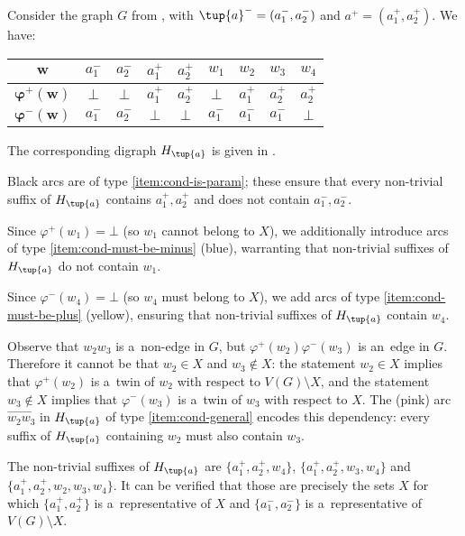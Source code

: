 \begin{example}
    Consider the graph $G$ from , with $\tup{a}^- = (a^-_1, a^-_2)$ and $a^+ = (a^+_1, a^+_2)$.
    We have:
    \begin{center}
        \begin{tabular}{|c||c|c|c|c|c|c|c|c|}
            \hline
            $\mathbf{w}$ & $a^-_1$ & $a^-_2$ & $a^+_1$ & $a^+_2$ & $w_1$ & $w_2$ & $w_3$ & $w_4$ \\ \hline \hline
            $\mathbf{\varphi^+(w)}$ & $\bot$ & $\bot$ & $a^+_1$ & $a^+_2$ & $\bot$ & $a^+_1$ & $a^+_2$ & $a^+_2$ \\ \hline
            $\mathbf{\varphi^-(w)}$ & $a^-_1$ & $a^-_2$ & $\bot$ & $\bot$ & $a^-_1$ & $a^-_1$ & $a^-_1$ & $\bot$ \\ \hline
        \end{tabular}
    \end{center}
    The corresponding digraph $H_{\tup{a}}$ is given in .

    Black arcs are of type \ref{item:cond-is-param}; these ensure that every non-trivial suffix of $H_{\tup{a}}$ contains $a^+_1, a^+_2$ and does not contain $a^-_1, a^-_2$.

    Since $\varphi^+(w_1) = \bot$ (so $w_1$ cannot belong to $X$), we additionally introduce arcs of type \ref{item:cond-must-be-minus} (blue), warranting that non-trivial suffixes of $H_{\tup{a}}$ do not contain $w_1$.

    Since $\varphi^-(w_4) = \bot$ (so $w_4$ must belong to $X$), we add arcs of type \ref{item:cond-must-be-plus} (yellow), ensuring that non-trivial suffixes of $H_{\tup{a}}$ contain $w_4$.

    Observe that $w_2w_3$ is a~non-edge in $G$, but $\varphi^+(w_2) \varphi^-(w_3)$ is an~edge in $G$.
    Therefore it cannot be that $w_2 \in X$ and $w_3 \notin X$: the statement $w_2 \in X$ implies that $\varphi^+(w_2)$ is a~twin of $w_2$ with respect to $V(G) \setminus X$, and the statement $w_3 \notin X$ implies that $\varphi^-(w_3)$ is a~twin of $w_3$ with respect to $X$.
    The (pink) arc $\vec{w_2w_3}$ in $H_{\tup{a}}$ of type \ref{item:cond-general} encodes this dependency: every suffix of $H_{\tup{a}}$ containing $w_2$ must also contain $w_3$.

    The non-trivial suffixes of $H_{\tup{a}}$ are $\{a^+_1, a^+_2, w_4\}$, $\{a^+_1, a^+_2, w_3, w_4\}$ and $\{a^+_1, a^+_2, w_2, w_3, w_4\}$.
    It can be verified that those are precisely the sets $X$ for which $\{a^+_1, a^+_2\}$ is a~representative of $X$ and $\{a^-_1, a^-_2\}$ is a~representative of $V(G) \setminus X$.
    

\end{example}
